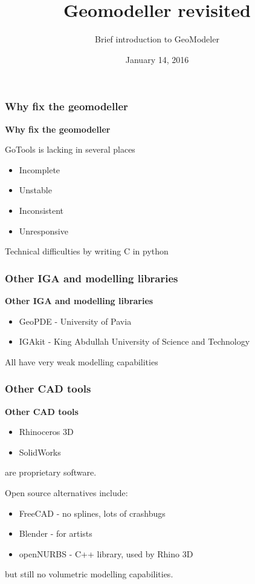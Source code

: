 \documentclass{beamer}
\title{Geomodeller revisited}
\author{Brief introduction to GeoModeler}
\institute{Kjetil A. Johannessen}
\date{January 14, 2016}
\theoremstyle{plain}
\theoremstyle{definition}
\begin{document}
\begin{frame}
\titlepage
\end{frame}
\begin{frame}
\frametitle{Why fix the geomodeller}
\textbf{Why fix the geomodeller}

GoTools is lacking in several places
\begin{itemize}
    \item Incomplete
    \item Unstable
    \item Inconsistent
    \item Unresponsive
\end{itemize}
Technical difficulties by writing C in python
\end{frame}


\begin{frame}
\frametitle{Other IGA and modelling libraries}
\textbf{Other IGA and modelling libraries}

\begin{itemize}
    \item GeoPDE - University of Pavia
    \item IGAkit - King Abdullah University of Science and Technology
\end{itemize}
All have very weak modelling capabilities
\end{frame}


\begin{frame}
\frametitle{Other CAD tools}
\textbf{Other CAD tools}

\begin{itemize}
    \item Rhinoceros 3D
    \item SolidWorks 
\end{itemize}
are proprietary software.

\pause
\vspace{1cm}
Open source alternatives include:
\begin{itemize}
    \item FreeCAD   - no splines, lots of crashbugs
    \item Blender   - for artists
    \item openNURBS - C++ library, used by Rhino 3D
\end{itemize}
\pause
but still no volumetric modelling capabilities.
\end{frame}
\end{document}
